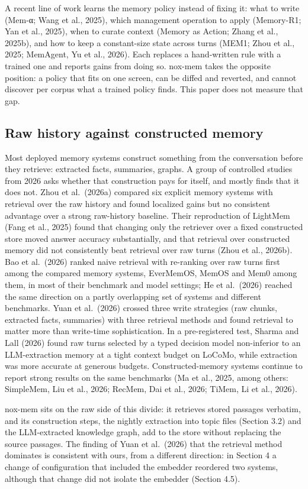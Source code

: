 \documentclass[a4paper,fleqn]{cas-sc}
\begin{document}
A recent line of work learns the memory policy instead of fixing it: what to write (Mem-α; Wang et al., 2025), which management operation to apply (Memory-R1; Yan et al., 2025), when to curate context (Memory as Action; Zhang et al., 2025b), and how to keep a constant-size state across turns (MEM1; Zhou et al., 2025; MemAgent, Yu et al., 2026). Each replaces a hand-written rule with a trained one and reports gains from doing so. nox-mem takes the opposite position: a policy that fits on one screen, can be diffed and reverted, and cannot discover per corpus what a trained policy finds. This paper does not measure that gap.

\subsection{Raw history against constructed memory}

Most deployed memory systems construct something from the conversation before they retrieve: extracted facts, summaries, graphs. A group of controlled studies from 2026 asks whether that construction pays for itself, and mostly finds that it does not. Zhou et al.~(2026a) compared six explicit memory systems with retrieval over the raw history and found localized gains but no consistent advantage over a strong raw-history baseline. Their reproduction of LightMem (Fang et al., 2025) found that changing only the retriever over a fixed constructed store moved answer accuracy substantially, and that retrieval over constructed memory did not consistently beat retrieval over raw turns (Zhou et al., 2026b). Bao et al.~(2026) ranked naive retrieval with re-ranking over raw turns first among the compared memory systems, EverMemOS, MemOS and Mem0 among them, in most of their benchmark and model settings; He et al.~(2026) reached the same direction on a partly overlapping set of systems and different benchmarks. Yuan et al.~(2026) crossed three write strategies (raw chunks, extracted facts, summaries) with three retrieval methods and found retrieval to matter more than write-time sophistication. In a pre-registered test, Sharma and Lall (2026) found raw turns selected by a typed decision model non-inferior to an LLM-extraction memory at a tight context budget on LoCoMo, while extraction was more accurate at generous budgets. Constructed-memory systems continue to report strong results on the same benchmarks (Ma et al., 2025, among others: SimpleMem, Liu et al., 2026; RecMem, Dai et al., 2026; TiMem, Li et al., 2026).

nox-mem sits on the raw side of this divide: it retrieves stored passages verbatim, and its construction steps, the nightly extraction into topic files (Section 3.2) and the LLM-extracted knowledge graph, add to the store without replacing the source passages. The finding of Yuan et al.~(2026) that the retrieval method dominates is consistent with ours, from a different direction: in Section 4 a change of configuration that included the embedder reordered two systems, although that change did not isolate the embedder (Section 4.5).
\end{document}

